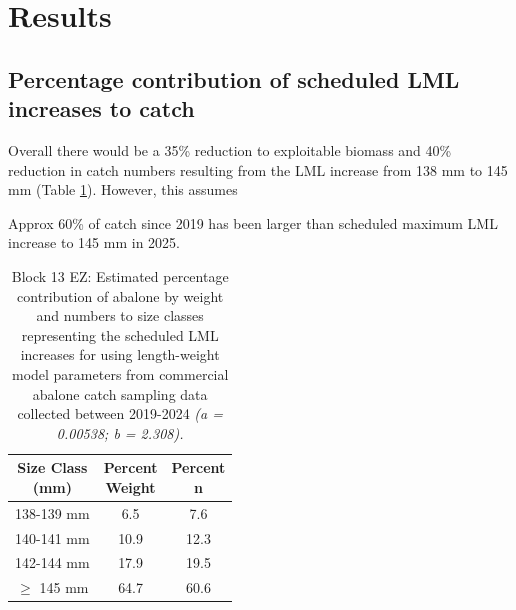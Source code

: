 \documentclass[
]{article}
\begin{document}
\section{Results}\label{results}

\subsection{Percentage contribution of scheduled LML increases to catch}\label{percentage-contribution-of-scheduled-lml-increases-to-catch}

Overall there would be a 35\% reduction to exploitable biomass and 40\% reduction in catch numbers resulting from the LML increase from 138 mm to 145 mm (Table \ref{tab:lmlsumtab}). However, this assumes

Approx 60\% of catch since 2019 has been larger than scheduled maximum LML increase to 145 mm in 2025.

\begin{table}

\caption{\label{tab:lmlsumtab}Block 13 EZ: Estimated percentage contribution of abalone by weight and numbers to size classes representing the scheduled LML increases for using length-weight model parameters from commercial abalone catch sampling data collected between 2019-2024\textit{ (a = 0.00538; b = 2.308).}}
\centering
\begin{tabular}[t]{ccc}
\toprule
\makecell[c]{Size Class\\(mm)} & \makecell[c]{Percent\\Weight} & \makecell[c]{Percent\\n}\\
\midrule
138-139 mm & 6.5 & 7.6\\
140-141 mm & 10.9 & 12.3\\
142-144 mm & 17.9 & 19.5\\
$\geq$ 145 mm & 64.7 & 60.6\\
\bottomrule
\end{tabular}
\end{table}
\end{document}
